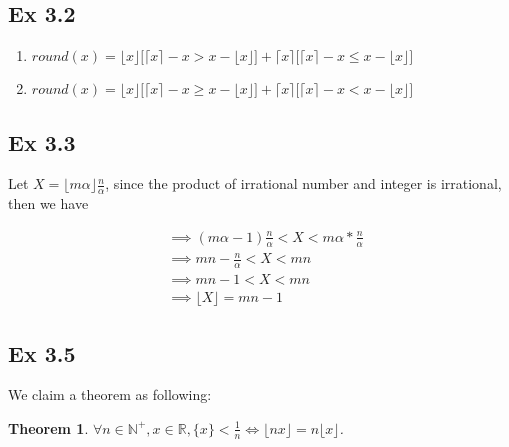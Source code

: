 \documentclass{article}
\newtheorem{theorem}{Theorem}[section]
\begin{document}
\subsection{Ex 3.2}

\renewcommand{\labelenumi}{\alph{enumi}}
\begin{enumerate}
    \item $round(x) = \lfloor x \rfloor \mathbf{[} \lceil x \rceil - x > x - \lfloor x \rfloor \mathbf{]} + \lceil x \rceil \mathbf{[} \lceil x \rceil - x \le x - \lfloor x \rfloor \mathbf{]}$
    \item $round(x) = \lfloor x \rfloor \mathbf{[} \lceil x \rceil - x \ge x - \lfloor x \rfloor \mathbf{]} + \lceil x \rceil \mathbf{[} \lceil x \rceil - x < x - \lfloor x \rfloor \mathbf{]}$
\end{enumerate}


\subsection{Ex 3.3}

Let $X = \lfloor m\alpha \rfloor \frac{n}{\alpha}$, since the product of irrational number and integer is irrational, then we have

\begin{equation}
    \begin{split}
       & \implies (m\alpha - 1)\frac{n}{\alpha} < X < m\alpha * \frac{n}{\alpha}\\
       & \implies mn - \frac{n}{\alpha} < X < mn\\
       & \implies mn - 1 < X < mn\\
       & \implies \lfloor X \rfloor = mn - 1
    \end{split}
\end{equation}

\subsection{Ex 3.5}

We claim a theorem as following:

\begin{theorem}
$\forall n \in  \mathbb{N}^{+}, x \in \mathbb{R}, \{x\} < \frac{1}{n} \iff \lfloor nx \rfloor = n \lfloor x \rfloor$.
\end{theorem}
\end{document}
